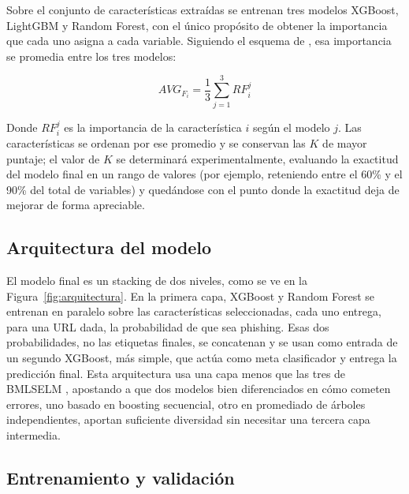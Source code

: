 Sobre el conjunto de características extraídas se entrenan tres modelos XGBoost, LightGBM y Random Forest, con el único propósito de obtener la importancia que cada uno asigna a cada variable. Siguiendo el esquema de \cite{kalabarige2023boosting}, esa importancia se promedia entre los tres modelos:

\begin{equation*}
AVG_{F_i} = \frac{1}{3} \sum_{j=1}^{3} RF_{i}^{j}
\end{equation*}

Donde $RF_{i}^{j}$ es la importancia de la característica $i$ según el modelo $j$. Las características se ordenan por ese promedio y se conservan las $K$ de mayor puntaje; el valor de $K$ se determinará experimentalmente, evaluando la exactitud del modelo final en un rango de valores (por ejemplo, reteniendo entre el 60\% y el 90\% del total de variables) y quedándose con el punto donde la exactitud deja de mejorar de forma apreciable.

\subsection{Arquitectura del modelo}

El modelo final es un stacking de dos niveles, como se ve en la Figura~\ref{fig:arquitectura}. En la primera capa, XGBoost y Random Forest se entrenan en paralelo sobre las características seleccionadas, cada uno entrega, para una URL dada, la probabilidad de que sea phishing. Esas dos probabilidades, no las etiquetas finales, se concatenan y se usan como entrada de un segundo XGBoost, más simple, que actúa como meta clasificador y entrega la predicción final. Esta arquitectura usa una capa menos que las tres de BMLSELM \cite{kalabarige2023boosting}, apostando a que dos modelos bien diferenciados en cómo cometen errores, uno basado en boosting secuencial, otro en promediado de árboles independientes, aportan suficiente diversidad sin necesitar una tercera capa intermedia.

\subsection{Entrenamiento y validación}

